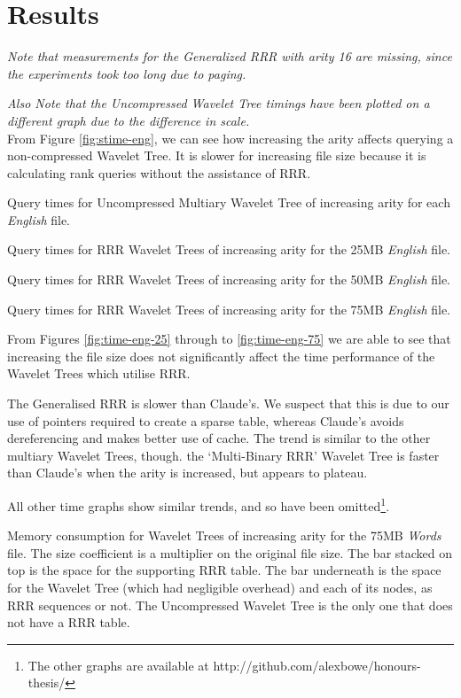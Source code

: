 \section{Results}
\label{sec:results}
\emph{Note that measurements for the Generalized RRR with arity 16 are missing, since the experiments took too long due to paging.}

\emph{Also Note that the Uncompressed Wavelet Tree timings have been plotted on 
a different graph due to the difference in scale.}\\

From Figure \ref{fig:stime-eng}, we can see how increasing the arity affects
querying a non-compressed Wavelet Tree. It is slower for increasing file size
because it is calculating rank queries without the assistance of RRR.


			{Query times for Uncompressed Multiary Wavelet Tree of increasing 
			arity for each \emph{English} file.}
		
			{Query times for RRR Wavelet Trees of increasing arity
			for the 25MB \emph{English} file.}
		
			{Query times for RRR Wavelet Trees of increasing arity
			for the 50MB \emph{English} file.}
		
			{Query times for RRR Wavelet Trees of increasing arity
			for the 75MB \emph{English} file.}

From Figures \ref{fig:time-eng-25} through to \ref{fig:time-eng-75} we are able 
to see that increasing the file size does not significantly affect the time
performance of the Wavelet Trees which utilise RRR.

The Generalised RRR is slower than Claude's. We suspect that this is due to our 
use of pointers required to create a sparse table, whereas Claude's avoids 
dereferencing and makes better use of cache. The trend is similar to the
other multiary Wavelet Trees, though. the `Multi-Binary RRR' Wavelet Tree
is faster than Claude's when the arity is increased, but appears to plateau.

All other time graphs show similar trends, and so have been omitted\footnote{The 
other graphs are available at http://github.com/alexbowe/honours-thesis/}.

			{Memory consumption for Wavelet Trees of increasing arity for
			the 75MB \emph{Words} file. The size coefficient is a multiplier
			on the original file size. The bar stacked on top is the space for
			the supporting RRR table. The bar underneath is the space for
			the Wavelet Tree (which had negligible overhead) and each of its
			nodes, as RRR sequences or not. The Uncompressed Wavelet Tree is
			the only one that does not have a RRR table.}

